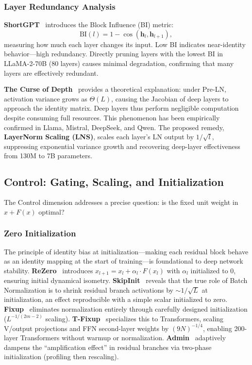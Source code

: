 \subsubsection{Layer Redundancy Analysis}

\textbf{ShortGPT}~\cite{men2024shortgpt} introduces the Block Influence (BI) metric:
\begin{equation}
  \mathrm{BI}(l) = 1 - \cos(\mathbf{h}_l, \mathbf{h}_{l+1}),
  \label{eq:block_influence}
\end{equation}
measuring how much each layer changes its input. Low BI indicates near-identity behavior---high redundancy. Directly pruning layers with the lowest BI in LLaMA-2-70B (80 layers) causes minimal degradation, confirming that many layers are effectively redundant.

\textbf{The Curse of Depth}~\cite{sun2025curse} provides a theoretical explanation: under Pre-LN, activation variance grows as $\Theta(L)$, causing the Jacobian of deep layers to approach the identity matrix. Deep layers thus perform negligible computation despite consuming full resources. This phenomenon has been empirically confirmed in Llama, Mistral, DeepSeek, and Qwen. The proposed remedy, \textbf{LayerNorm Scaling (LNS)}, scales each layer's LN output by $1/\sqrt{l}$, suppressing exponential variance growth and recovering deep-layer effectiveness from 130M to 7B parameters.

\subsection{Control: Gating, Scaling, and Initialization}
\label{subsec:residual_control}

The Control dimension addresses a precise question: is the fixed unit weight in $x + F(x)$ optimal?

\subsubsection{Zero Initialization}

The principle of identity bias at initialization---making each residual block behave as an identity mapping at the start of training---is foundational to deep network stability. \textbf{ReZero}~\cite{bachlechner2021rezero} introduces $x_{l+1} = x_l + \alpha_l \cdot F(x_l)$ with $\alpha_l$ initialized to 0, ensuring initial dynamical isometry. \textbf{SkipInit}~\cite{de2020batch} reveals that the true role of Batch Normalization is to shrink residual branch activations by $\sim 1/\sqrt{L}$ at initialization, an effect reproducible with a simple scalar initialized to zero. \textbf{Fixup}~\cite{zhang2019fixup} eliminates normalization entirely through carefully designed initialization ($L^{-1/(2m-2)}$ scaling). \textbf{T-Fixup}~\cite{huang2020tfixup} specializes this to Transformers, scaling V/output projections and FFN second-layer weights by $(9N)^{-1/4}$, enabling 200-layer Transformers without warmup or normalization. \textbf{Admin}~\cite{liu2020understanding} adaptively dampens the ``amplification effect'' in residual branches via two-phase initialization (profiling then rescaling).

